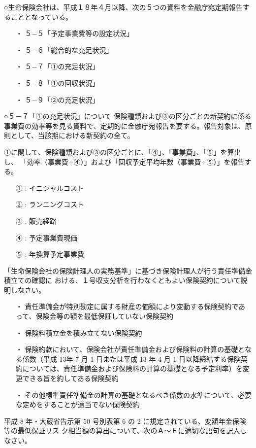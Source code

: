\documentclass[report,gutter=10mm,fore-edge=10mm,uplatex,dvipdfmx]{jlreq}
\begin{document}
○生命保険会社は、平成１８年４月以降、次の５つの資料を金融庁宛定期報告することとなっている。
\begin{itemize}
\item[ ・]  ５−５「予定事業費等の設定状況」
\item[ ・]  ５−６「総合的な充足状況」
\item[ ・]  ５−７「①の充足状況」
\item[ ・]  ５−８「①の回収状況」
\item[ ・]  ５−９「②の充足状況」
\end{itemize}

○５－７「①の充足状況」について
保険種類および③の区分ごとの新契約に係る事業費の効率等を見る資料で、定期的に金融庁宛報告を要する。報告対象は、原則として、当該期における新契約の全て。

①に関して、保険種類および③の区分ごとに、「④」、「事業費」、「⑤」を算出し、
「効率（事業費÷④）」および「回収予定平均年数（事業費÷⑤）」を報告する。

\begin{itemize}
\item[① : ] イニシャルコスト
\item[② : ] ランニングコスト
\item[③ : ] 販売経路
\item[④ : ] 予定事業費現価
\item[⑤ : ] 年換算予定事業費
\end{itemize}

「生命保険会社の保険計理人の実務基準」に基づき保険計理人が行う責任準備金積立ての確認に
おける、１号収支分析を行わなくともよい保険契約について説明しなさい。
\answer{}
\begin{itemize}
\item[ ・] 責任準備金が特別勘定に属する財産の価額により変動する保険契約であって、保険金等の額を最低保証していない保険契約
\item[ ・] 保険料積立金を積み立てない保険契約
\item[ ・] 保険約款において、保険会社が責任準備金および保険料の計算の基礎となる係数（平成 13年 7 月 1 日または平成 13 年 4 月 1 日以降締結する保険契約については、責任準備金および保険料の計算の基礎となる予定利率）を変更できる旨を約してある保険契約
\item[ ・] その他標準責任準備金の計算の基礎となるべき係数の水準について、必要な定めをすることが適当でない保険契約
\end{itemize}

平成 8 年・大蔵省告示第 50 号別表第 6 の 2 に規定されている、変額年金保険等の最低保証リス
ク相当額の算出について、次のＡ～Ｅに適切な語句を記入しなさい。
\end{document}
